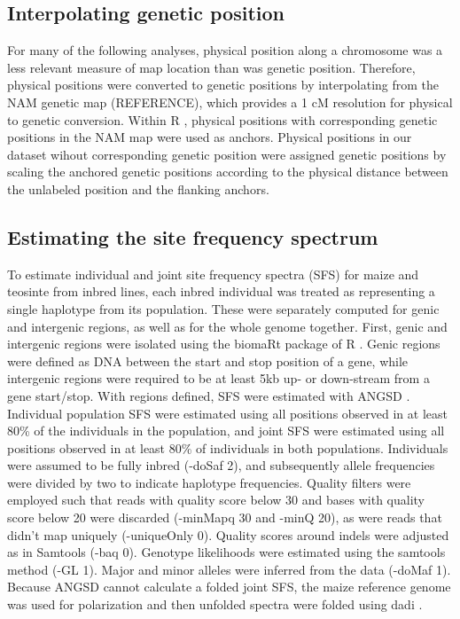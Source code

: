 \documentclass{pnastwo}
\begin{document}
\begin{article}
\begin{materials}
\subsection{Interpolating genetic position}
For many of the following analyses, physical position along a
chromosome was a less relevant measure of map location than was genetic
position. Therefore, physical positions were converted to genetic
positions by interpolating from the NAM genetic map (REFERENCE), which
provides a 1 cM resolution for physical to genetic conversion. Within
R \cite{R}, physical positions with corresponding genetic positions in
the NAM map were used as anchors. Physical positions in our dataset
wihout corresponding genetic position were assigned genetic positions by scaling
the anchored genetic positions according to the physical distance
between the unlabeled position and the flanking anchors.

\subsection{Estimating the site frequency spectrum}
To estimate individual  and joint site frequency spectra (SFS) for
maize and teosinte from inbred lines, each inbred individual was treated as representing
a single haplotype from its population. These were
separately computed for genic and intergenic regions, as well as for
the whole genome together. First, genic and intergenic regions were isolated using
the biomaRt package \cite{biomaRt1,biomaRt2} of R \cite{R}. Genic
regions were defined as DNA between the start and stop position of a
gene, while intergenic regions were required to be at least 5kb up- or
down-stream from a gene start/stop. With regions defined, SFS were
estimated with ANGSD \cite{angsd}. Individual population SFS were
estimated using all positions observed in at least 80\% of the
individuals in the population, and joint SFS were estimated using all
positions observed in at least 80\% of individuals in both
populations. Individuals were
assumed to be fully inbred (-doSaf 2), and subsequently allele frequencies were
divided by two to indicate haplotype frequencies. Quality filters were
employed such that reads with quality score below 30 and bases with
quality score below 20 were discarded (-minMapq 30 and -minQ 20), as were reads that didn't map
uniquely (-uniqueOnly 0). Quality scores around indels were adjusted
as in Samtools (-baq 0). Genotype likelihoods were estimated using the samtools
method (-GL 1). Major and minor alleles were inferred from the data
(-doMaf 1). Because ANGSD cannot calculate a folded joint SFS, the
maize reference genome was used for polarization and then unfolded spectra
were folded using dadi \cite{dadi}.


\end{materials}
\end{article}
\end{document}
